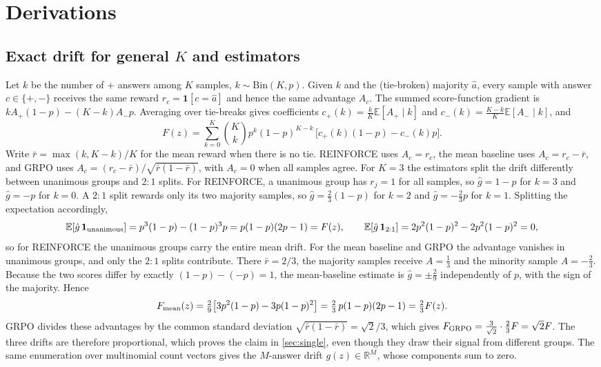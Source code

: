 \section{Derivations}
\label{app:derivations}

\subsection{Exact drift for general $K$ and estimators}
\label{app:drift}
Let $k$ be the number of $+$ answers among $K$ samples, $k\sim\mathrm{Bin}(K,p)$.
Given $k$ and the (tie-broken) majority $\hat a$, every sample with answer $c\in\{+,-\}$ receives the same reward $r_c=\mathbf 1[c=\hat a]$ and hence the same advantage $A_c$. The summed score-function gradient is $kA_+(1-p)-(K-k)A_-p$.
Averaging over tie-breaks gives coefficients $c_+(k)=\frac kK\mathbb E[A_+\mid k]$ and $c_-(k)=\frac{K-k}K\mathbb E[A_-\mid k]$, and
\begin{equation*}
  F(z)=\sum_{k=0}^K\binom Kk p^k(1-p)^{K-k}\,\big[c_+(k)(1-p)-c_-(k)p\big].
\end{equation*}
Write $\bar r=\max(k,K-k)/K$ for the mean reward when there is no tie. REINFORCE uses $A_c=r_c$, the mean baseline uses $A_c=r_c-\bar r$, and GRPO uses $A_c=(r_c-\bar r)/\sqrt{\bar r(1-\bar r)}$, with $A_c=0$ when all samples agree.
For $K=3$ the estimators split the drift differently between unanimous groups and $2{:}1$ splits.
For REINFORCE, a unanimous group has $r_j=1$ for all samples, so $\hat g=1-p$ for $k=3$ and $\hat g=-p$ for $k=0$. A $2{:}1$ split rewards only its two majority samples, so $\hat g=\tfrac23(1-p)$ for $k=2$ and $\hat g=-\tfrac23p$ for $k=1$. Splitting the expectation accordingly,
\begin{equation*}
  \mathbb E[\hat g\,\mathbf 1_{\rm unanimous}]=p^3(1-p)-(1-p)^3p=p(1-p)(2p-1)=F(z),\qquad
  \mathbb E[\hat g\,\mathbf 1_{2:1}]=2p^2(1-p)^2-2p^2(1-p)^2=0,
\end{equation*}
so for REINFORCE the unanimous groups carry the entire mean drift.
For the mean baseline and GRPO the advantage vanishes in unanimous groups, and only the $2{:}1$ splits contribute. There $\bar r=2/3$, the majority samples receive $A=\tfrac13$ and the minority sample $A=-\tfrac23$. Because the two scores differ by exactly $(1-p)-(-p)=1$, the mean-baseline estimate is $\hat g=\pm\tfrac29$ independently of $p$, with the sign of the majority. Hence
\begin{equation*}
  F_{\rm mean}(z)=\tfrac29\big[3p^2(1-p)-3p(1-p)^2\big]=\tfrac23\,p(1-p)(2p-1)=\tfrac23F(z).
\end{equation*}
GRPO divides these advantages by the common standard deviation $\sqrt{\bar r(1-\bar r)}=\sqrt2/3$, which gives $F_{\rm GRPO}=\tfrac{3}{\sqrt2}\cdot\tfrac23F=\sqrt2F$. The three drifts are therefore proportional, which proves the claim in \cref{sec:single}, even though they draw their signal from different groups.
The same enumeration over multinomial count vectors gives the $M$-answer drift $g(z)\in\mathbb R^M$, whose components sum to zero.

